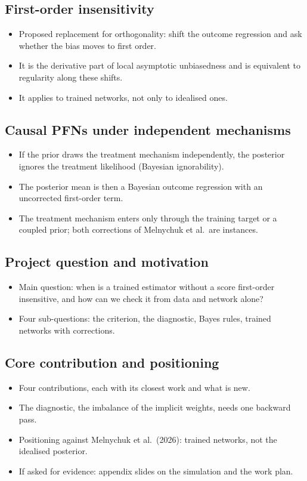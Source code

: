 \documentclass[11pt]{article}
\begin{document}
\subsection*{First-order insensitivity}
\begin{itemize}
\item Proposed replacement for orthogonality: shift the outcome regression and ask whether the bias moves to first order.
\item It is the derivative part of local asymptotic unbiasedness and is equivalent to regularity along these shifts.
\item It applies to trained networks, not only to idealised ones.
\end{itemize}

\subsection*{Causal PFNs under independent mechanisms}
\begin{itemize}
\item If the prior draws the treatment mechanism independently, the posterior ignores the treatment likelihood (Bayesian ignorability).
\item The posterior mean is then a Bayesian outcome regression with an uncorrected first-order term.
\item The treatment mechanism enters only through the training target or a coupled prior; both corrections of Melnychuk et al.\ are instances.
\end{itemize}

\subsection*{Project question and motivation}
\begin{itemize}
\item Main question: when is a trained estimator without a score first-order insensitive, and how can we check it from data and network alone?
\item Four sub-questions: the criterion, the diagnostic, Bayes rules, trained networks with corrections.
\end{itemize}

\subsection*{Core contribution and positioning}
\begin{itemize}
\item Four contributions, each with its closest work and what is new.
\item The diagnostic, the imbalance of the implicit weights, needs one backward pass.
\item Positioning against Melnychuk et al.\ (2026): trained networks, not the idealised posterior.
\item If asked for evidence: appendix slides on the simulation and the work plan.
\end{itemize}
\end{document}
